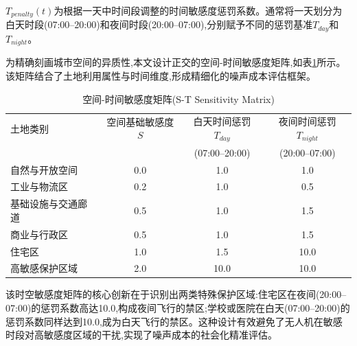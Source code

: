$T_{penalty}(t)$为根据一天中时间段调整的时间敏感度惩罚系数。通常将一天划分为白天时段(07:00--20:00)和夜间时段(20:00--07:00),分别赋予不同的惩罚基准$T_{day}$和$T_{night}$。

为精确刻画城市空间的异质性,本文设计正交的空间-时间敏感度矩阵,如表\ref{tab:spatiotemporal_sensitivity}所示。该矩阵结合了土地利用属性与时间维度,形成精细化的噪声成本评估框架。

\begin{table}[htbp]
\centering
\caption{空间-时间敏感度矩阵(S-T Sensitivity Matrix)}
\label{tab:spatiotemporal_sensitivity}
\begin{tabular}{lccc}
\hline
土地类别 & 空间基础敏感度$S$ & 白天时间惩罚$T_{day}$ & 夜间时间惩罚$T_{night}$ \\
& & (07:00--20:00) & (20:00--07:00) \\
\hline
自然与开放空间 & 0.0 & 1.0 & 1.0 \\
工业与物流区 & 0.2 & 1.0 & 0.5 \\
基础设施与交通廊道 & 0.5 & 1.0 & 1.5 \\
商业与行政区 & 0.5 & 1.0 & 1.5 \\
住宅区 & 1.0 & 1.5 & 10.0 \\
高敏感保护区域 & 2.0 & 10.0 & 10.0 \\
\hline
\end{tabular}
\end{table}

该时空敏感度矩阵的核心创新在于识别出两类特殊保护区域:住宅区在夜间(20:00--07:00)的惩罚系数高达10.0,构成夜间飞行的禁区;学校或医院在白天(07:00--20:00)的惩罚系数同样达到10.0,成为白天飞行的禁区。这种设计有效避免了无人机在敏感时段对高敏感度区域的干扰,实现了噪声成本的社会化精准评估。


